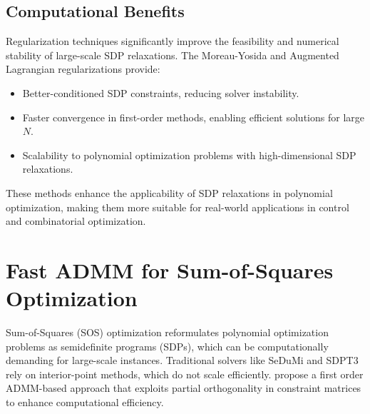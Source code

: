 \documentclass[12pt]{l4dc2021}
\begin{document}
    \subsection{Computational Benefits}
        Regularization techniques significantly improve the feasibility and numerical stability of large-scale SDP relaxations. The Moreau-Yosida and Augmented Lagrangian regularizations provide:
        \begin{itemize}
            \item Better-conditioned SDP constraints, reducing solver instability.
            \item Faster convergence in first-order methods, enabling efficient solutions for large \( N \).
            \item Scalability to polynomial optimization problems with high-dimensional SDP relaxations.
        \end{itemize}
        These methods enhance the applicability of SDP relaxations in polynomial optimization, making them more suitable for real-world applications in control and combinatorial optimization.  
    
\section{Fast ADMM for Sum-of-Squares Optimization}  
        Sum-of-Squares (SOS) optimization reformulates polynomial optimization problems as semidefinite programs (SDPs), which can be computationally demanding for large-scale instances. Traditional solvers like SeDuMi and SDPT3 rely on interior-point methods, which do not scale efficiently. \cite{zheng2018fast} propose a first order ADMM-based approach that exploits partial orthogonality in constraint matrices to enhance computational efficiency.
\end{document}
